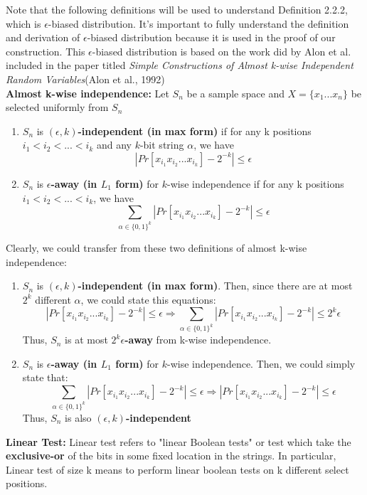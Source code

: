 \documentclass[a4paper, english]{paper}
\begin{document}
Note that the following definitions will be used to understand Definition 2.2.2, which is $\epsilon$-biased distribution. It's important to fully understand the definition and derivation of $\epsilon$-biased distribution because it is used in the proof of our construction. This $\epsilon$-biased distribution is based on the work did by Alon et al. included in the paper titled \textit{Simple Constructions of Almost k-wise Independent Random Variables}(Alon et al., 1992)\\

	\noindent\textbf{Almost k-wise independence:}
	Let $S_n$ be a sample space and $X=\{x_1...x_n\}$ be selected uniformly from $S_n$
	\begin{enumerate}
	\item $S_n$ is  \textbf{$(\epsilon,k)$-independent (in max form)} if for any k positions $i_1<i_2<...<i_k$ and any $k$-bit string $\alpha$, we have
		$$|Pr[x_{i_1}x_{i_2}...x_{i_k}]-2^{-k}|\le \epsilon$$
	\item $S_n$ is \textbf{$\epsilon$-away (in $L_1$ form)} for $k$-wise independence if for any k positions $i_1<i_2<...<i_k$, we have
		$$\sum_{\alpha\in\{0,1\}^k}|Pr[x_{i_1}x_{i_2}...x_{i_k}]-2^{-k}| \le \epsilon$$
	\end{enumerate}
	\quad Clearly, we could transfer from these two definitions of almost k-wise independence:
	\begin{enumerate}
	\item $S_n$ is  \textbf{$(\epsilon,k)$-independent (in max form)}. Then, since there are at most $2^k$ different $\alpha$, we could state this equations:
$$|Pr[x_{i_1}x_{i_2}...x_{i_k}]-2^{-k}|\le \epsilon \Rightarrow \sum_{\alpha\in\{0,1\}^k}|Pr[x_{i_1}x_{i_2}...x_{i_k}]-2^{-k}| \le 2^k\epsilon$$
	Thus, $S_n$ is at most \textbf{$2^k\epsilon$-away} from k-wise independence.
	\item $S_n$ is \textbf{$\epsilon$-away (in $L_1$ form)} for $k$-wise independence. Then, we could simply state that:
$$\sum_{\alpha\in\{0,1\}^k}|Pr[x_{i_1}x_{i_2}...x_{i_k}]-2^{-k}| \le \epsilon \Rightarrow |Pr[x_{i_1}x_{i_2}...x_{i_k}]-2^{-k}|\le \epsilon $$
	Thus, $S_n$ is also \textbf{$(\epsilon,k)$-independent}
	\end{enumerate}
		
	\noindent\textbf{Linear Test:} Linear test refers to "linear Boolean tests" or test which take the \textbf{exclusive-or} of the bits in some fixed location in the strings. In particular, Linear test of size k means to perform linear boolean tests on k different select positions.\\
\end{document}
